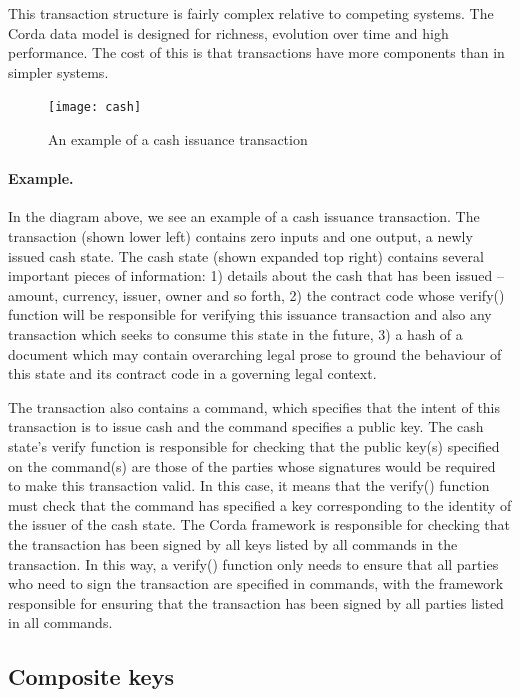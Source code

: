 \documentclass{article}
\begin{document}
This transaction structure is fairly complex relative to competing systems. The Corda data model is designed for
richness, evolution over time and high performance. The cost of this is that transactions have more components than
in simpler systems.

\begin{figure}[H]
\texttt{[image: cash]}
\caption{An example of a cash issuance transaction}
\end{figure}

\paragraph{Example.}In the diagram above, we see an example of a cash issuance transaction. The transaction (shown
lower left) contains zero inputs and one output, a newly issued cash state. The cash state (shown expanded top
right) contains several important pieces of information: 1) details about the cash that has been issued -- amount,
currency, issuer, owner and so forth, 2) the contract code whose verify() function will be responsible for
verifying this issuance transaction and also any transaction which seeks to consume this state in the future, 3) a
hash of a document which may contain overarching legal prose to ground the behaviour of this state and its contract
code in a governing legal context.

The transaction also contains a command, which specifies that the intent of this transaction is to issue cash and
the command specifies a public key. The cash state's verify function is responsible for checking that the public
key(s) specified on the command(s) are those of the parties whose signatures would be required to make this
transaction valid. In this case, it means that the verify() function must check that the command has specified a
key corresponding to the identity of the issuer of the cash state. The Corda framework is responsible for checking
that the transaction has been signed by all keys listed by all commands in the transaction. In this way, a verify()
function only needs to ensure that all parties who need to sign the transaction are specified in commands, with the
framework responsible for ensuring that the transaction has been signed by all parties listed in all commands.

\subsection{Composite keys}\label{sec:composite-keys}
\end{document}
